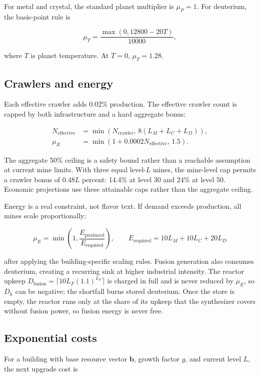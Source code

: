 \documentclass[11pt]{article}
\begin{document}
For metal and crystal, the standard planet multiplier is $\mu_P=1$. For deuterium, the basis-point rule is

\[
\mu_T = \frac{\max(0,12800-20T)}{10000},
\]

where $T$ is planet temperature. At $T=0$, $\mu_T=1.28$.

\subsection{Crawlers and energy}

Each effective crawler adds 0.02\% production. The effective crawler count is capped by both infrastructure and a hard aggregate bonus:

\begin{align}
N_{\mathrm{effective}} &= \min\left(N_{\mathrm{crawler}},\,8(L_M+L_C+L_D)\right),\\
\mu_R &= \min\left(1+0.0002N_{\mathrm{effective}},\,1.5\right).
\end{align}

The aggregate 50\% ceiling is a safety bound rather than a reachable assumption at current mine limits. With three equal level-$L$ mines, the mine-level cap permits a crawler bonus of $0.48L$ percent: 14.4\% at level 30 and 24\% at level 50. Economic projections use these attainable caps rather than the aggregate ceiling.

Energy is a real constraint, not flavor text. If demand exceeds production, all mines scale proportionally:

\[
\mu_E=\min\left(1,\frac{E_{\mathrm{produced}}}{E_{\mathrm{required}}}\right),
\qquad
E_{\mathrm{required}}=10L_M+10L_C+20L_D
\]

after applying the building-specific scaling rules. Fusion generation also consumes deuterium, creating a recurring sink at higher industrial intensity. The reactor upkeep $D_{\mathrm{fusion}}=\lceil 10 L_F (1.1)^{L_F} \rceil$ is charged in full and is never reduced by $\mu_E$, so $D_h$ can be negative; the shortfall burns stored deuterium. Once the store is empty, the reactor runs only at the share of its upkeep that the synthesizer covers without fusion power, so fusion energy is never free.

\subsection{Exponential costs}

For a building with base resource vector $\mathbf{b}$, growth factor $g$, and current level $L$, the next upgrade cost is
\end{document}

